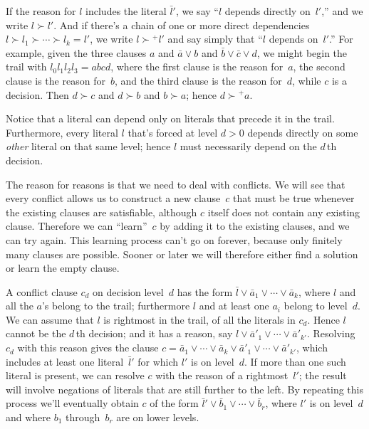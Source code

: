 \def\sucp{\mathrel{{\succ}\!^+}}
If the reason for $l$ includes the literal $\bar l'$, we say
``$l$ depends directly on~$l'$,'' and we write $l\succ l'$.
And if there's a chain of one or more direct dependencies
$l\succ l_1\succ\cdots\succ l_k=l'$, we write $l\sucp l'$ and
say simply that ``$l$ depends on~$l'$.'' For example, given the
three clauses $a$ and $\bar a\lor b$ and $\bar b\lor\bar c\lor d$,
we might begin the trail with $l_0l_1l_2l_3=abcd$, where the first clause
is the reason for~$a$, the second clause is the reason for~$b$, and the
third clause is the reason for~$d$, while $c$ is a decision.
Then $d\succ c$ and $d\succ b$ and $b\succ a$; hence $d\sucp a$.

Notice that a literal can depend only on literals that precede it in the trail.
Furthermore,
every literal $l$ that's forced at level $d>0$ depends directly on some
{\it other\/} literal on that same level; hence $l$ must necessarily
depend on the $d\,$th decision.

The reason for reasons is that we need to deal with conflicts. We will see
that every conflict allows us to construct a new clause~$c$ that must be
true whenever the existing clauses are satisfiable, although $c$ itself
does not contain any existing clause. Therefore we can ``learn''~$c$ by
adding it to the existing clauses, and we can try again. This learning
process can't go on forever, because only finitely many clauses are possible.
Sooner or later we will therefore either find a solution or learn the
empty clause.

A conflict clause $c_d$ on decision level~$d$ has the form
$\bar l\lor\bar a_1\lor\cdots\lor\bar a_k$, where $l$ and all the $a$'s
belong to the trail; furthermore $l$ and at least one $a_i$ belong to
level~$d$. We can assume that $l$ is rightmost in the trail,
of all the literals in $c_d$.
Hence $l$ cannot be the $d\,$th decision; and it has a
reason, say $l\lor\bar a'_1\lor\cdots\lor\bar a'_{k'}$. Resolving $c_d$
with this reason gives the clause $c=\bar a_1\lor\cdots\lor\bar a_k\lor\bar
a'_1\lor\cdots\lor\bar a'_{k'}$, which includes at least one literal~$\bar l'$
for which $l'$ is on level~$d$. If more than one such literal is present,
we can resolve $c$ with the reason of a rightmost~$l'$;
the result will involve negations of literals that are still further
to the left. By repeating this process we'll eventually obtain
$c$ of the form $\bar l'\lor\bar b_1\lor\cdots\lor\bar b_r$, where
$l'$ is on level~$d$ and where $b_1$ through~$b_r$ are on lower levels.

